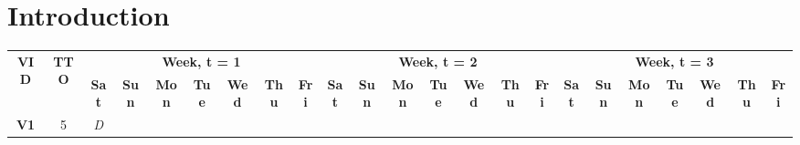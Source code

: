 \documentclass[pdflatex,sn-mathphys]{sn-jnl}%
\begin{document}
\section{Introduction}\label{introduction}



\begin{table}[tbh]
\begin{adjustbox}{width=\textwidth}
\begin{tabular}{|cc|ccccccc|ccccccc|ccccccc|}
\hline
\multicolumn{1}{|c|}{\multirow{2}{*}{\textbf{VID}}}     & \multirow{2}{*}{\textbf{TTO}}    & \multicolumn{7}{c|}{\textbf{Week, t = 1}}                                                                                                                                                                                            & \multicolumn{7}{c|}{\textbf{Week, t = 2}}                                                                                                                                                                                            & \multicolumn{7}{c|}{\textbf{Week, t = 3}} \\                                                                                           
\cline{3-23}
\multicolumn{1}{|c|}{}                                  &                                  & \multicolumn{1}{c|}{\textbf{Sat}} & \multicolumn{1}{c|}{\textbf{Sun}} & \multicolumn{1}{c|}{\textbf{Mon}} & \multicolumn{1}{c|}{\textbf{Tue}} & \multicolumn{1}{c|}{\textbf{Wed}} & \multicolumn{1}{c|}{\textbf{Thu}} & \textbf{Fri} & \multicolumn{1}{c|}{\textbf{Sat}} & \multicolumn{1}{c|}{\textbf{Sun}} & \multicolumn{1}{c|}{\textbf{Mon}} & \multicolumn{1}{c|}{\textbf{Tue}} & \multicolumn{1}{c|}{\textbf{Wed}} & \multicolumn{1}{c|}{\textbf{Thu}} & \textbf{Fri} & \multicolumn{1}{c|}{\textbf{Sat}} & \multicolumn{1}{c|}{\textbf{Sun}} & \multicolumn{1}{c|}{\textbf{Mon}} & \multicolumn{1}{c|}{\textbf{Tue}} & \multicolumn{1}{c|}{\textbf{Wed}} & \multicolumn{1}{c|}{\textbf{Thu}} & \textbf{Fri} \\ \hline
\multicolumn{1}{|c|}{\textbf{V1}}                       & 5                                & \multicolumn{1}{c|}{\textit{D}}   & \multicolumn{5}{c|}{}                                                                                                                                                             &              & \multicolumn{1}{c|}{}             & \multicolumn{1}{c|}{}             & \multicolumn{1}{c|}{}             & \multicolumn{1}{c|}{}             & \multicolumn{1}{c|}{}             & \multicolumn{1}{c|}{}             &              & \multicolumn{1}{c|}{}             & \multicolumn{1}{c|}{}             & \multicolumn{1}{c|}{}             & \multicolumn{1}{c|}{}             & \multicolumn{1}{c|}{}             & \multicolumn{1}{c|}{}             &              \\ \hline

\end{tabular}
\end{adjustbox}
\end{table}
\end{document}
